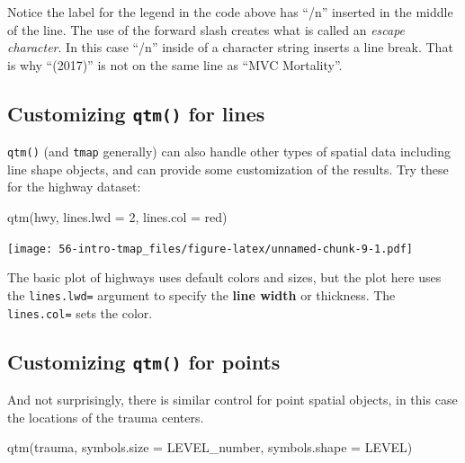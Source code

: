 \documentclass[
]{book}
\newenvironment{Shaded}{\begin{snugshade}}{\end{snugshade}}
\newcommand{\AttributeTok}[1]{\textcolor[rgb]{0.77,0.63,0.00}{#1}}
\newcommand{\DecValTok}[1]{\textcolor[rgb]{0.00,0.00,0.81}{#1}}
\newcommand{\FunctionTok}[1]{\textcolor[rgb]{0.00,0.00,0.00}{#1}}
\newcommand{\NormalTok}[1]{#1}
\newcommand{\StringTok}[1]{\textcolor[rgb]{0.31,0.60,0.02}{#1}}
\newenvironment{rmdnote}[1]
  {
  \begin{itemize}
  \renewcommand{\labelitemi}{
    \raisebox{-.7\height}[0pt][0pt]{
      {\setkeys{Gin}{width=3em,keepaspectratio}\texttt{[image: images/\#1]}}
    }
  }
  \setlength{\fboxsep}{1em}
  \begin{note}
  \item
  }
  {
  \end{note}
  \end{itemize}
  }
\begin{document}
\begin{rmdnote}{note}
Notice the label for the legend in the code above has ``/n'' inserted in the middle of the line. The use of the forward slash creates what is called an \emph{escape character}. In this case ``/n'' inside of a character string inserts a line break. That is why ``(2017)'' is not on the same line as ``MVC Mortality''.

\end{rmdnote}

\hypertarget{customizing-qtm-for-lines}{%
\subsection{\texorpdfstring{Customizing \texttt{qtm()} for lines}{Customizing qtm() for lines}}\label{customizing-qtm-for-lines}}

\texttt{qtm()} (and \texttt{tmap} generally) can also handle other types of spatial data including line shape objects, and can provide some customization of the results. Try these for the highway dataset:

\begin{Shaded}
\begin{Highlighting}[]
\FunctionTok{qtm}\NormalTok{(hwy, }
    \AttributeTok{lines.lwd =} \DecValTok{2}\NormalTok{, }
    \AttributeTok{lines.col =} \StringTok{\textquotesingle{}red\textquotesingle{}}\NormalTok{)}
\end{Highlighting}
\end{Shaded}

\texttt{[image: 56-intro-tmap\_files/figure-latex/unnamed-chunk-9-1.pdf]}

The basic plot of highways uses default colors and sizes, but the plot here uses the \texttt{lines.lwd=} argument to specify the \textbf{line width} or thickness. The \texttt{lines.col=} sets the color.

\hypertarget{customizing-qtm-for-points}{%
\subsection{\texorpdfstring{Customizing \texttt{qtm()} for points}{Customizing qtm() for points}}\label{customizing-qtm-for-points}}

And not surprisingly, there is similar control for point spatial objects, in this case the locations of the trauma centers.

\begin{Shaded}
\begin{Highlighting}[]
\FunctionTok{qtm}\NormalTok{(trauma,}
    \AttributeTok{symbols.size =} \StringTok{\textquotesingle{}LEVEL\_number\textquotesingle{}}\NormalTok{, }
    \AttributeTok{symbols.shape =} \StringTok{\textquotesingle{}LEVEL\textquotesingle{}}\NormalTok{)}
\end{Highlighting}
\end{Shaded}
\end{document}
